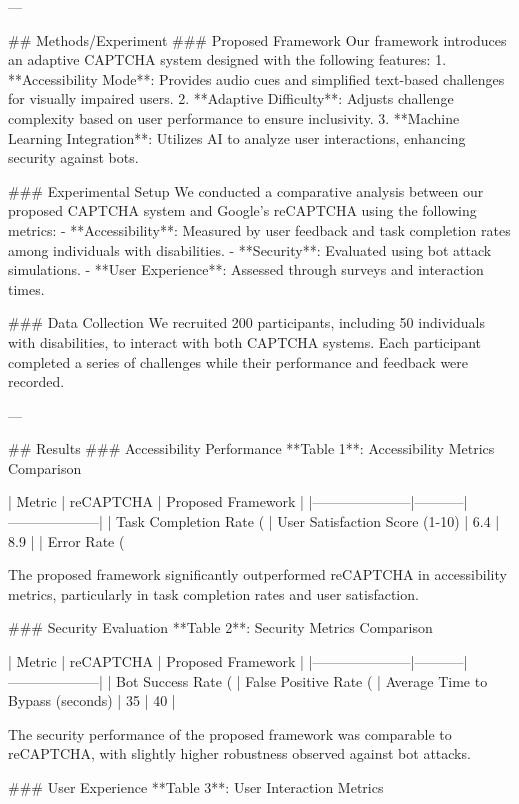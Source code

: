 ---

## Methods/Experiment
### Proposed Framework
Our framework introduces an adaptive CAPTCHA system designed with the following features:
1. **Accessibility Mode**: Provides audio cues and simplified text-based challenges for visually impaired users.
2. **Adaptive Difficulty**: Adjusts challenge complexity based on user performance to ensure inclusivity.
3. **Machine Learning Integration**: Utilizes AI to analyze user interactions, enhancing security against bots.

### Experimental Setup
We conducted a comparative analysis between our proposed CAPTCHA system and Google's reCAPTCHA using the following metrics:
- **Accessibility**: Measured by user feedback and task completion rates among individuals with disabilities.
- **Security**: Evaluated using bot attack simulations.
- **User Experience**: Assessed through surveys and interaction times.

### Data Collection
We recruited 200 participants, including 50 individuals with disabilities, to interact with both CAPTCHA systems. Each participant completed a series of challenges while their performance and feedback were recorded.

---

## Results
### Accessibility Performance
**Table 1**: Accessibility Metrics Comparison

| Metric              | reCAPTCHA | Proposed Framework |
|---------------------|-----------|--------------------|
| Task Completion Rate (%
| User Satisfaction Score (1-10) | 6.4       | 8.9                |
| Error Rate (%

The proposed framework significantly outperformed reCAPTCHA in accessibility metrics, particularly in task completion rates and user satisfaction.

### Security Evaluation
**Table 2**: Security Metrics Comparison

| Metric              | reCAPTCHA | Proposed Framework |
|---------------------|-----------|--------------------|
| Bot Success Rate (%
| False Positive Rate (%
| Average Time to Bypass (seconds) | 35        | 40                 |

The security performance of the proposed framework was comparable to reCAPTCHA, with slightly higher robustness observed against bot attacks.

### User Experience
**Table 3**: User Interaction Metrics

